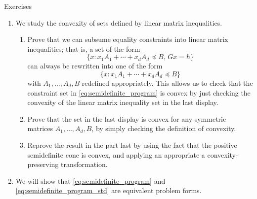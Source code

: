 \begin{xcb}{Exercises}
\begin{enumerate}[label=\thechapter.\arabic*]
\begin{enumerate}[label=\alph*.]
\item Now for the analogous constrained equivalence, prove that
  \begin{alignat*}{2}
  &\minimize_x \quad && f(x) \\ 
  &\st \quad && \|x\|_1 \leq s \\
  & && \|x\|_\infty \leq t \\
  & && x \in C
  \end{alignat*}
  and 
  \begin{alignat*}{2}
  &\minimize_{x,y,z} \quad && f(x) \\  
  &\st \quad && \one^\T y \leq s \\
  & && z \leq t \\
  & && -y \leq x \leq y \\
  & && -z\one \leq x \leq z\one \\
  & && x \in C, \; y,z \geq 0.
  \end{alignat*}
  are equivalent problems.
\end{enumerate}

\item \label{ex:linear_matrix_ineq}
  We study the convexity of sets defined by linear matrix inequalities. 

\begin{enumerate}[label=\alph*.]
\item Prove that we can subsume equality constraints into linear matrix
  inequalities; that is, a set of the form   
  \[
  \{x : x_1A_1 + \cdots + x_d A_d \preceq B, \, Gx = h\}
  \]
  can always be rewritten into one of the form 
  \[
  \{x : x_1A_1 + \cdots + x_d A_d \preceq B\}
  \]
  with $A_1,\dots,A_d,B$ redefined appropriately. This allows us to check that
  the constraint set in \eqref{eq:semidefinite_program} is convex by just
  checking the convexity of the linear matrix inequality set in the last
  display.  

\item Prove that the set in the last display is convex for any symmetric
  matrices $A_1,\dots,A_d,B$, by simply checking the definition of convexity.  

\item Reprove the result in the part last by using the fact that the positive 
  semidefinite cone is convex, and applying an appropriate a 
  convexity-preserving transformation.  
\end{enumerate}

\item \label{ex:semidefinite_program_std} 
  We will show that \eqref{eq:semidefinite_program} and
  \eqref{eq:semidefinite_program_std} are equivalent problem forms. 


\end{enumerate}
\end{xcb}
